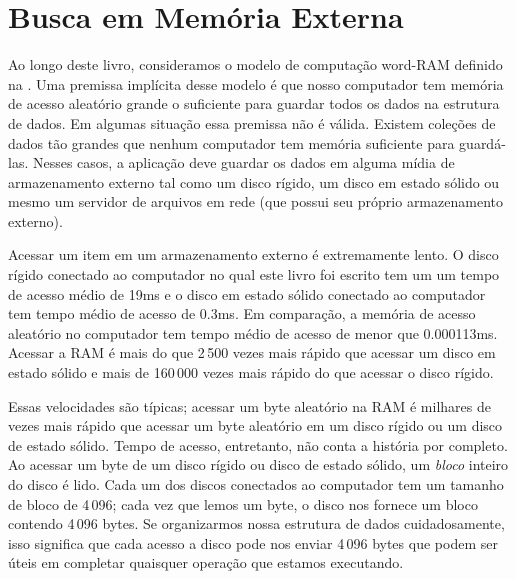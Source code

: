 \chapter{Busca em Memória Externa}

Ao longo deste livro, consideramos o modelo de computação word-RAM 
definido na .   Uma premissa implícita desse
modelo é que nosso computador tem memória de acesso aleatório 
grande o suficiente para guardar todos os dados na estrutura de dados.
Em algumas situação essa premissa não é válida. Existem coleções de dados
tão grandes que nenhum computador tem memória suficiente para guardá-las.
Nesses casos, a aplicação deve guardar os dados em alguma mídia de armazenamento
externo tal como um disco rígido, um disco em estado sólido ou mesmo
um servidor de arquivos em rede (que possui seu próprio armazenamento externo).

%
%
%
%
Acessar um item em um armazenamento externo é extremamente lento.
O disco rígido conectado ao computador no qual este livro foi escrito tem um
um tempo de acesso médio de 19ms e o disco em estado sólido conectado ao computador
tem tempo médio de acesso de 0.3ms. Em comparação, a memória de acesso aleatório
no computador tem tempo médio de acesso de menor que
0.000113ms. 
Acessar a RAM é mais do que 2\,500 vezes mais rápido que acessar um disco
em estado sólido e mais de 160\,000 vezes mais rápido do que acessar o disco rígido.

% 
% 

Essas velocidades são típicas; acessar um byte aleatório na RAM é
milhares de vezes mais rápido que acessar um byte aleatório em um disco
rígido ou um disco de estado sólido. Tempo de acesso, entretanto, não
conta a história por completo. Ao acessar um byte de um disco rígido ou 
disco de estado sólido, um \emph{bloco} inteiro
%
do disco é lido. Cada um dos discos conectados ao computador tem um tamanho 
de bloco de 4\,096; cada vez que lemos um byte, o disco nos fornece um bloco
contendo 4\,096 bytes. Se organizarmos nossa estrutura de dados cuidadosamente, isso
significa que cada acesso a disco pode nos enviar 4\,096 bytes que podem
ser úteis em completar quaisquer operação que estamos executando. 

